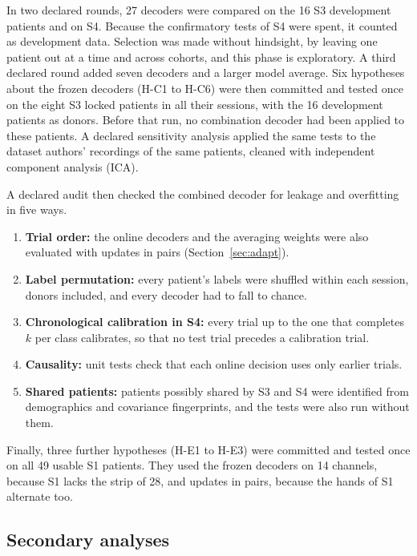 \documentclass{ieeeaccess}
\begin{document}
In two declared rounds, 27 decoders were compared on the 16 S3 development patients and on S4. Because the confirmatory tests of S4 were spent, it counted as development data. Selection was made without hindsight, by leaving one patient out at a time and across cohorts, and this phase is exploratory. A third declared round added seven decoders and a larger model average. Six hypotheses about the frozen decoders (H-C1 to H-C6) were then committed and tested once on the eight S3 locked patients in all their sessions, with the 16 development patients as donors. Before that run, no combination decoder had been applied to these patients. A declared sensitivity analysis applied the same tests to the dataset authors' recordings of the same patients, cleaned with independent component analysis (ICA).

A declared audit then checked the combined decoder for leakage and overfitting in five ways.
\begin{enumerate}
\item \textbf{Trial order:} the online decoders and the averaging weights were also evaluated with updates in pairs (Section~\ref{sec:adapt}).
\item \textbf{Label permutation:} every patient's labels were shuffled within each session, donors included, and every decoder had to fall to chance.
\item \textbf{Chronological calibration in S4:} every trial up to the one that completes $k$ per class calibrates, so that no test trial precedes a calibration trial.
\item \textbf{Causality:} unit tests check that each online decision uses only earlier trials.
\item \textbf{Shared patients:} patients possibly shared by S3 and S4 were identified from demographics and covariance fingerprints, and the tests were also run without them.
\end{enumerate}
Finally, three further hypotheses (H-E1 to H-E3) were committed and tested once on all 49 usable S1 patients. They used the frozen decoders on 14 channels, because S1 lacks the strip of 28, and updates in pairs, because the hands of S1 alternate too.

\subsection{Secondary analyses}\label{sec:secondary}
\end{document}
